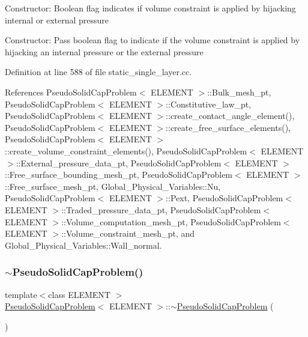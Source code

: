 Constructor\+: Boolean flag indicates if volume constraint is applied by hijacking internal or external pressure

Constructor\+: Pass boolean flag to indicate if the volume constraint is applied by hijacking an internal pressure or the external pressure 

Definition at line 588 of file static\+\_\+single\+\_\+layer.\+cc.



References Pseudo\+Solid\+Cap\+Problem$<$ E\+L\+E\+M\+E\+N\+T $>$\+::\+Bulk\+\_\+mesh\+\_\+pt, Pseudo\+Solid\+Cap\+Problem$<$ E\+L\+E\+M\+E\+N\+T $>$\+::\+Constitutive\+\_\+law\+\_\+pt, Pseudo\+Solid\+Cap\+Problem$<$ E\+L\+E\+M\+E\+N\+T $>$\+::create\+\_\+contact\+\_\+angle\+\_\+element(), Pseudo\+Solid\+Cap\+Problem$<$ E\+L\+E\+M\+E\+N\+T $>$\+::create\+\_\+free\+\_\+surface\+\_\+elements(), Pseudo\+Solid\+Cap\+Problem$<$ E\+L\+E\+M\+E\+N\+T $>$\+::create\+\_\+volume\+\_\+constraint\+\_\+elements(), Pseudo\+Solid\+Cap\+Problem$<$ E\+L\+E\+M\+E\+N\+T $>$\+::\+External\+\_\+pressure\+\_\+data\+\_\+pt, Pseudo\+Solid\+Cap\+Problem$<$ E\+L\+E\+M\+E\+N\+T $>$\+::\+Free\+\_\+surface\+\_\+bounding\+\_\+mesh\+\_\+pt, Pseudo\+Solid\+Cap\+Problem$<$ E\+L\+E\+M\+E\+N\+T $>$\+::\+Free\+\_\+surface\+\_\+mesh\+\_\+pt, Global\+\_\+\+Physical\+\_\+\+Variables\+::\+Nu, Pseudo\+Solid\+Cap\+Problem$<$ E\+L\+E\+M\+E\+N\+T $>$\+::\+Pext, Pseudo\+Solid\+Cap\+Problem$<$ E\+L\+E\+M\+E\+N\+T $>$\+::\+Traded\+\_\+pressure\+\_\+data\+\_\+pt, Pseudo\+Solid\+Cap\+Problem$<$ E\+L\+E\+M\+E\+N\+T $>$\+::\+Volume\+\_\+computation\+\_\+mesh\+\_\+pt, Pseudo\+Solid\+Cap\+Problem$<$ E\+L\+E\+M\+E\+N\+T $>$\+::\+Volume\+\_\+constraint\+\_\+mesh\+\_\+pt, and Global\+\_\+\+Physical\+\_\+\+Variables\+::\+Wall\+\_\+normal.

\mbox{\label{classPseudoSolidCapProblem_aec2a79e44dfd785b2978419210b053b8}} 
\subsubsection{\texorpdfstring{$\sim$\+Pseudo\+Solid\+Cap\+Problem()}{~PseudoSolidCapProblem()}\hspace{0.1cm}{\footnotesize\ttfamily [1/2]}}
{\footnotesize\ttfamily template$<$class E\+L\+E\+M\+E\+NT $>$ \\
\hyperlink{classPseudoSolidCapProblem}{Pseudo\+Solid\+Cap\+Problem}$<$ E\+L\+E\+M\+E\+NT $>$\+::$\sim$\hyperlink{classPseudoSolidCapProblem}{Pseudo\+Solid\+Cap\+Problem} (\begin{DoxyParamCaption}{ }\end{DoxyParamCaption})}



